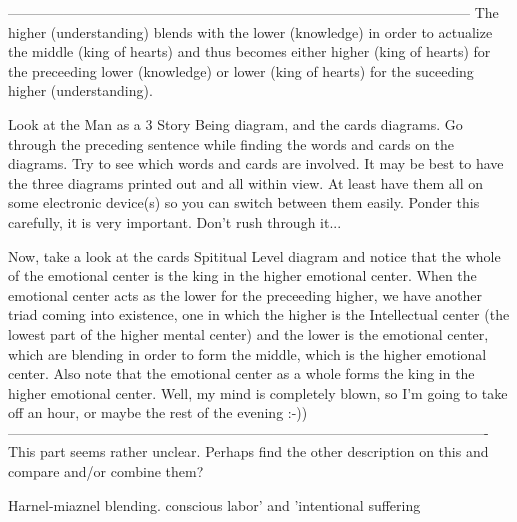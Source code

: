 \documentclass[12pt,letterpaper]{book}
\begin{document}
---------------------------------------------------------------------------------------------------
The higher (understanding) blends with the lower (knowledge) in order to actualize the middle (king of hearts) and thus becomes either higher (king of hearts) for the preceeding lower (knowledge) or lower (king of hearts) for the suceeding higher (understanding). 

Look at the Man as a 3 Story Being diagram, and the cards diagrams. Go through the preceding sentence while finding the words and cards on the diagrams. Try to see which words and cards are involved. It may be best to have the three diagrams printed out and all within view. At least have them all on some electronic device(s) so you can switch between them easily. Ponder this carefully, it is very important. Don't rush through it...

Now, take a look at the cards Spititual Level diagram and notice that the whole of the emotional center is the king in the higher emotional center. When the emotional center acts as the lower for the preceeding higher, we have another triad coming into existence, one in which the higher is the Intellectual center (the lowest part of the higher mental center) and the lower is the emotional center, which are blending in order to form the middle, which is the higher emotional center. Also note that the emotional center as a whole forms the king in the higher emotional center. Well, my mind is completely blown, so I'm going to take off an hour, or maybe the rest of the evening :-))
-------------------------------------------------------------------------------------------------------
This part seems rather unclear. Perhaps find the other description on this and compare and/or combine them?

Harnel-miaznel blending. conscious labor' and 'intentional suffering
\end{document}
